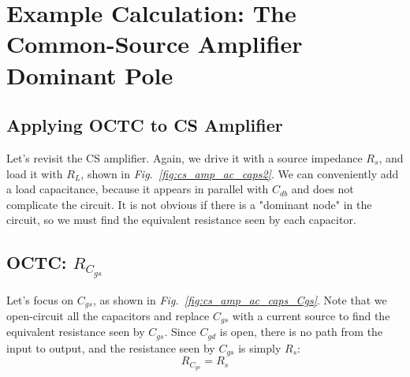 \section{Example Calculation:  The Common-Source Amplifier Dominant Pole}
\subsection{Applying OCTC to CS Amplifier}
Let's revisit the CS amplifier.  Again, we drive it with a source impedance $R_s$, and load it with $R_L$, shown in \emph{Fig.~\ref{fig:cs_amp_ac_caps2}}.  We can conveniently add a load capacitance, because it appears in parallel with $C_{db}$ and does not complicate the circuit. It is not obvious if there is a "dominant node" in the circuit, so we must find the equivalent resistance seen by each capacitor. 
\subsection{OCTC: \texorpdfstring{$R_{C_{gs}}$}{Equivalent Gate-Source Capacitor Resistance}}
Let's focus on $C_{gs}$, as shown in \emph{Fig.~\ref{fig:cs_amp_ac_caps_Cgs}}. Note that we open-circuit all the capacitors and replace $C_{gs}$ with a current source to find the equivalent resistance seen by $C_{gs}$.
 Since $C_{gd}$ is open, there is no path from the input to output, and the resistance seen by $C_{gs}$ is simply $R_s$:
    \begin{equation}
        \boxed{R_{C_{gs}} = R_{s}}
    \end{equation}
